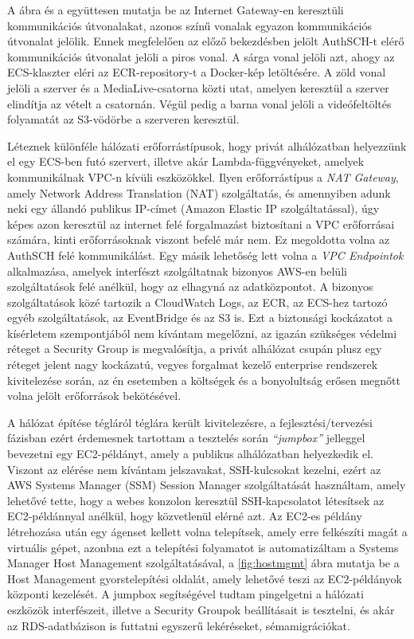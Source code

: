 A  ábra és a  együttesen mutatja be az Internet Gateway-en keresztüli kommunikációs útvonalakat, azonos színű vonalak egyazon kommunikációs útvonalat jelölik. Ennek megfelelően az előző bekezdésben jelölt AuthSCH-t elérő kommunikációs útvonalat jelöli a piros vonal. A sárga vonal jelöli azt, ahogy az ECS-klaszter eléri az ECR-repository-t a Docker-kép letöltésére. A zöld vonal jelöli a szerver és a MediaLive-csatorna közti utat, amelyen keresztül a szerver elindítja az vételt a csatornán. Végül pedig a barna vonal jelöli a videófeltöltés folyamatát az S3-vödörbe a szerveren keresztül.

Léteznek különféle hálózati erőforrástípusok, hogy privát alhálózatban helyezzünk el egy ECS-ben futó szervert, illetve akár Lambda-függvényeket, amelyek kommunikálnak VPC-n kívüli eszközökkel. Ilyen erőforrástípus a \emph{NAT Gateway}, amely Network Address Translation (NAT) szolgáltatás, és amennyiben adunk neki egy állandó publikus IP-címet (Amazon Elastic IP szolgáltatással), úgy képes azon keresztül az internet felé forgalmazást biztosítani a VPC erőforrásai számára, kinti erőforrásoknak viszont befelé már nem. Ez megoldotta volna az AuthSCH felé kommunikálást. Egy másik lehetőség lett volna a \emph{VPC Endpointok} alkalmazása, amelyek interfészt szolgáltatnak bizonyos AWS-en belüli szolgáltatások felé anélkül, hogy az elhagyná az adatközpontot. A bizonyos szolgáltatások közé tartozik a CloudWatch Logs, az ECR, az ECS-hez tartozó egyéb szolgáltatások, az EventBridge és az S3 is. Ezt a biztonsági kockázatot a kísérletem szempontjából nem kívántam megelőzni, az igazán szükséges védelmi réteget a Security Group is megvalósítja, a privát alhálózat csupán plusz egy réteget jelent nagy kockázatú, vegyes forgalmat kezelő enterprise rendszerek kivitelezése során, az én esetemben a költségek és a bonyolultság erősen megnőtt volna jelölt erőforrások bekötésével.

A hálózat építése tégláról téglára került kivitelezésre, a fejlesztési/tervezési fázisban ezért érdemesnek tartottam a tesztelés során \emph{``jumpbox''} jelleggel bevezetni egy EC2-példányt, amely a publikus alhálózatban helyezkedik el. Viszont az elérése nem kívántam jelszavakat, SSH-kulcsokat kezelni, ezért az AWS Systems Manager (SSM) Session Manager szolgáltatását használtam, amely lehetővé tette, hogy a webes konzolon keresztül SSH-kapcsolatot létesítsek az EC2-példánnyal anélkül, hogy közvetlenül elérné azt. Az EC2-es példány létrehozása után egy ágenset kellett volna telepítsek, amely erre felkészíti magát a virtuális gépet, azonbna ezt a telepítési folyamatot is automatizáltam a Systems Manager Host Management szolgáltatásával, a \ref{fig:hostmgmt} ábra mutatja be a Host Management gyorstelepítési oldalát, amely lehetővé teszi az EC2-példányok központi kezelését. A jumpbox segítségével tudtam pingelgetni a hálózati eszközök interfészeit, illetve a Security Groupok beállításait is tesztelni, és akár az RDS-adatbázison is futtatni egyszerű lekéréseket, sémamigrációkat.

